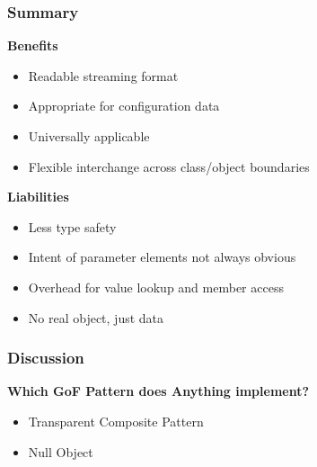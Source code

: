 \subsubsection{Summary}
\textbf{Benefits}
\begin{itemize}[topsep=0pt]
    \itemsep -0.4em
    \item Readable streaming format
    \item Appropriate for configuration data
    \item Universally applicable
    \item Flexible interchange across class/object boundaries
\end{itemize}
\textbf{Liabilities}
\begin{itemize}[topsep=0pt]
    \itemsep -0.4em
    \item Less type safety
    \item Intent of parameter elements not always obvious
    \item Overhead for value lookup and member access
    \item No real object, just data
\end{itemize}
\subsubsection{Discussion}
\textbf{Which GoF Pattern does Anything implement?}
\begin{itemize}[topsep=0pt]
    \itemsep -0.4em
    \item Transparent Composite Pattern
    \item Null Object
\end{itemize}
